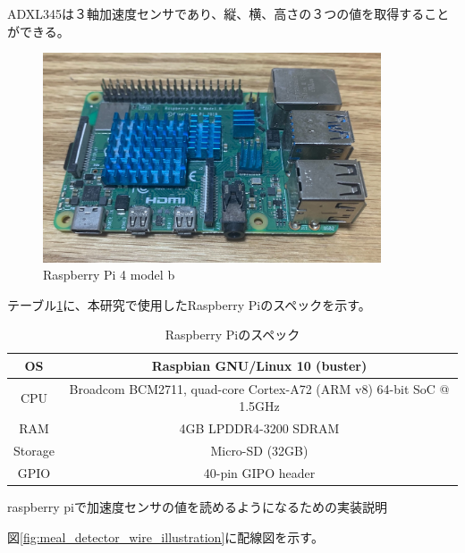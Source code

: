 ADXL345は３軸加速度センサであり、縦、横、高さの３つの値を取得することができる。

\begin{figure}[htbp]
  \caption{Raspberry Pi 4 model b}
  \label{fig:raspi4_model_b}
  \begin{center}
    \includegraphics[bb=0 0 1300 1100,width=10cm]{assets/raspi4_model_b.jpg}
  \end{center}
\end{figure}

テーブル\ref{tb:raspberry_pi_spec}に、本研究で使用したRaspberry Piのスペックを示す。

\begin{table}[htbp]
  \caption{Raspberry Piのスペック}
  \label{tb:raspberry_pi_spec}
  \begin{center}
    \begin{tabular}{|c||c|}
      \hline
      OS  & Raspbian GNU/Linux 10 (buster) \\\hline
      CPU & Broadcom BCM2711, quad-core Cortex-A72 (ARM v8) 64-bit SoC @ 1.5GHz \\\hline
      RAM & 4GB LPDDR4-3200 SDRAM \\\hline
      Storage & Micro-SD (32GB) \\\hline
      GPIO & 40-pin GIPO header \\\hline
    \end{tabular}
  \end{center}
\end{table}

raspberry piで加速度センサの値を読めるようになるための実装説明

図\ref{fig:meal_detector_wire_illustration}に配線図を示す。

